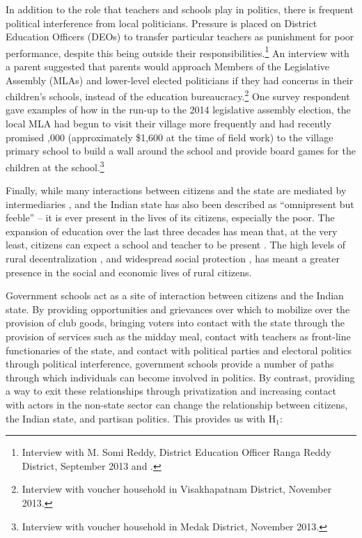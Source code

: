 \documentclass[hidelinks, 12pt, titlepage]{article}
\begin{document}
	In addition to the role that teachers and schools play in politics, there is frequent political interference from local politicians.  Pressure is placed on District Education Officers (DEOs) to transfer particular teachers as punishment for poor performance, despite this being outside their responsibilities.\footnote{Interview with M. Somi Reddy, District Education Officer Ranga Reddy District, September 2013 and \cite{Beteille2015}.}  An interview with a parent suggested that parents would approach Members of the Legislative Assembly (MLAs) and lower-level elected politicians if they had concerns in their children's schools, instead of the education bureaucracy.\footnote{Interview with voucher household in Visakhapatnam District, November 2013.}  One survey respondent gave examples of how in the run-up to the 2014 legislative assembly election, the local MLA had begun to visit their village more frequently and had recently promised ,000 (approximately \$1,600 at the time of field work) to the village primary school to build a wall around the school and provide board games for the children at the school.\footnote{Interview with voucher household in Medak District, November 2013.}

    Finally, while many interactions between citizens and the state are mediated by intermediaries \citep{Auerbach2016, Berenschot2010,Krishna2007}, and the Indian state has also been described as ``omnipresent but feeble'' \citep[6]{Kohli1990} -- it is ever present in the lives of its citizens, especially the poor.  The expansion of education over the last three decades has mean that, at the very least, citizens can expect a school and teacher to be present \citep{Government2009}.  The high levels of rural decentralization \citep{Auerbach2020,Kruks-Wisner2018}, and widespread social protection \citep{Kapur2013a}, has meant a greater presence in the social and economic lives of rural citizens.

	Government schools act as a site of interaction between citizens and the Indian state.  By providing opportunities and grievances over which to mobilize over the provision of club goods, bringing voters into contact with the state through the provision of services such as the midday meal, contact with teachers as front-line functionaries of the state, and contact with political parties and electoral politics through political interference, government schools provide a number of paths through which individuals can become involved in politics.  By contrast, providing a way to exit these relationships through privatization and increasing contact with actors in the non-state sector can change the relationship between citizens, the Indian state, and partisan politics.  This provides us with H$_{1}$:
\end{document}
